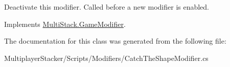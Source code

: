 Deactivate this modifier. Called before a new modifier is enabled. 



Implements \hyperlink{class_multi_stack_1_1_game_modifier_abe04db6ab31f5e5063739d8e5a3f7ad1}{Multi\+Stack.\+Game\+Modifier}.



The documentation for this class was generated from the following file\+:\begin{DoxyCompactItemize}
\item 
Multiplayer\+Stacker/\+Scripts/\+Modifiers/Catch\+The\+Shape\+Modifier.\+cs\end{DoxyCompactItemize}
